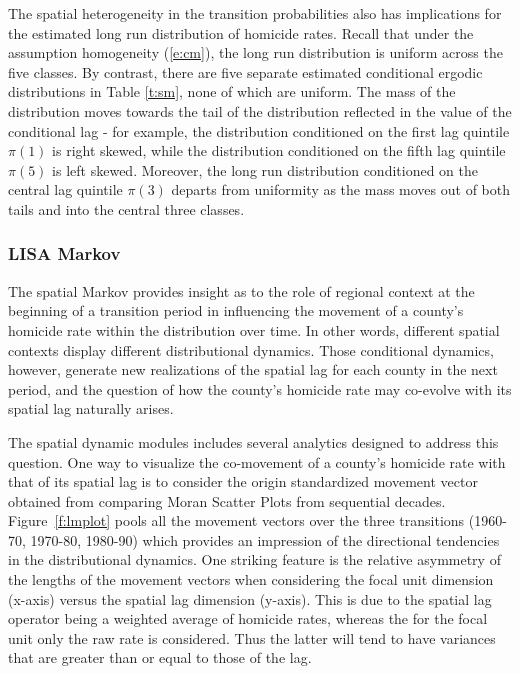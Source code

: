 \documentclass[11pt, titlepage]{amsart}
\begin{document}
The spatial heterogeneity in the transition probabilities also has
implications for the estimated long run distribution of homicide rates.
Recall that under the assumption homogeneity (\ref{e:cm}), the long run
distribution is uniform across the five classes. By contrast, there are
five separate estimated conditional ergodic distributions in Table
\ref{t:sm},
none of which are uniform. The mass of the distribution moves towards
the tail of the distribution reflected in the value of the conditional
lag - for example, the distribution conditioned on the first lag
quintile $\pi(1)$ is right skewed, while the distribution conditioned on the
fifth lag quintile $\pi(5)$ is left skewed. Moreover, the long run distribution
conditioned on the central lag quintile $\pi(3)$ departs from uniformity as the mass moves
out of both tails and into the central three classes.


\subsubsection{LISA Markov}
The spatial Markov provides insight as to the role of regional context
at the beginning of a transition period in influencing the movement of a
county's homicide rate within the distribution over time. In other
words, different spatial contexts display  different distributional dynamics.
Those conditional dynamics, however, generate new realizations of
the spatial lag for each county in the next period, and the question of
how the county's homicide rate may co-evolve with its spatial lag
naturally arises.

The spatial dynamic modules includes several analytics designed to
address this question. One way to visualize the co-movement of a
county's homicide rate with that of its spatial lag is to consider the
origin standardized movement vector \citep{Rey:2011uq} obtained from comparing Moran
Scatter Plots \citep{Anselin:1996ze} from sequential decades.
Figure~\ref{f:lmplot} pools all the movement vectors over the three
transitions (1960-70, 1970-80, 1980-90) which  provides an impression of
the directional tendencies in the distributional dynamics. One striking
feature is the relative asymmetry of the lengths of the movement vectors
when considering the focal unit dimension (x-axis) versus the spatial lag
dimension (y-axis). This is due to  the spatial lag operator being a weighted
average of homicide rates, whereas the for the focal unit only the raw
rate is considered. Thus the latter will tend to have variances that are
greater than or equal to those of the lag.
\end{document}
